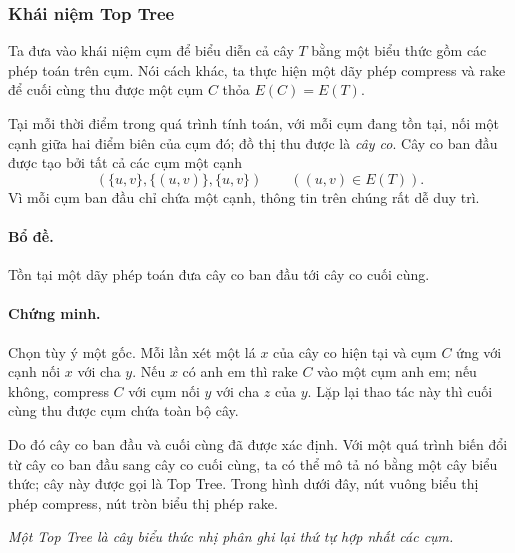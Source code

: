 \documentclass[11pt]{article}
\providecommand{\square}{\mathord{\vcenter{\hrule height .6em width .6em}}}
\begin{document}
\subsubsection{Khái niệm Top Tree}

Ta đưa vào khái niệm cụm để biểu diễn cả cây \(T\) bằng một biểu thức gồm các
phép toán trên cụm. Nói cách khác, ta thực hiện một dãy phép compress và rake
để cuối cùng thu được một cụm \(C\) thỏa \(E(C)=E(T)\).

Tại mỗi thời điểm trong quá trình tính toán, với mỗi cụm đang tồn tại, nối một
cạnh giữa hai điểm biên của cụm đó; đồ thị thu được là \emph{cây co}. Cây co
ban đầu được tạo bởi tất cả các cụm một cạnh
\[
  (\{u,v\},\{(u,v)\},\{u,v\})\qquad ((u,v)\in E(T)).
\]
Vì mỗi cụm ban đầu chỉ chứa một cạnh, thông tin trên chúng rất dễ duy trì.

\paragraph{Bổ đề.}
Tồn tại một dãy phép toán đưa cây co ban đầu tới cây co cuối cùng.

\paragraph{Chứng minh.}
Chọn tùy ý một gốc. Mỗi lần xét một lá \(x\) của cây co hiện tại và cụm \(C\)
ứng với cạnh nối \(x\) với cha \(y\). Nếu \(x\) có anh em thì rake \(C\) vào
một cụm anh em; nếu không, compress \(C\) với cụm nối \(y\) với cha \(z\) của
\(y\). Lặp lại thao tác này thì cuối cùng thu được cụm chứa toàn bộ cây.

Do đó cây co ban đầu và cuối cùng đã được xác định. Với một quá trình biến đổi
từ cây co ban đầu sang cây co cuối cùng, ta có thể mô tả nó bằng một cây biểu
thức; cây này được gọi là Top Tree. Trong hình dưới đây, nút vuông biểu thị phép
compress, nút tròn biểu thị phép rake.

\begin{center}

\smallskip
\textit{Một Top Tree là cây biểu thức nhị phân ghi lại thứ tự hợp nhất các cụm.}
\end{center}
\end{document}
